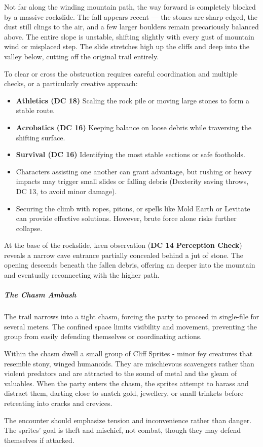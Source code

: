 {\entryfont Not far along the winding mountain path, the way forward is completely blocked by a massive rockslide. The fall appears recent — the stones are sharp-edged, the dust still clings to the air, and a few larger boulders remain precariously balanced above. The entire slope is unstable, shifting slightly with every gust of mountain wind or misplaced step. The slide stretches high up the cliffs and deep into the valley below, cutting off the original trail entirely.

To clear or cross the obstruction requires careful coordination and multiple checks, or a particularly creative approach:
\begin{itemize}
	\item \textbf{Athletics (DC 18)} Scaling the rock pile or moving large stones to form a stable route.
	\item \textbf{Acrobatics (DC 16)} Keeping balance on loose debris while traversing the shifting surface.
	\item \textbf{Survival (DC 16)} Identifying the most stable sections or safe footholds.
	\item Characters assisting one another can grant advantage, but rushing or heavy impacts may trigger small slides or falling debris (Dexterity saving throws, DC 13, to avoid minor damage).
	\item Securing the climb with ropes, pitons, or spells like Mold Earth or Levitate can provide effective solutions. However, brute force alone risks further collapse.
\end{itemize}
At the base of the rockslide, keen observation (\textbf{DC 14 Perception Check}) reveals a narrow cave entrance partially concealed behind a jut of stone. The opening descends beneath the fallen debris, offering an \hyperref[subsubsec:MountainCave]{} deeper into the mountain and eventually reconnecting with the higher path.}
\subparagraph*{The Chasm Ambush}
{\entryfont The trail narrows into a tight chasm, forcing the party to proceed in single-file for several meters. The confined space limits visibility and movement, preventing the group from easily defending themselves or coordinating actions.

Within the chasm dwell a small group of Cliff Sprites - minor fey creatures that resemble stony, winged humanoids. They are mischievous scavengers rather than violent predators and are attracted to the sound of metal and the gleam of valuables. When the party enters the chasm, the sprites attempt to harass and distract them, darting close to snatch gold, jewellery, or small trinkets before retreating into cracks and crevices.

The encounter should emphasize tension and inconvenience rather than danger. The sprites' goal is theft and mischief, not combat, though they may defend themselves if attacked.}

